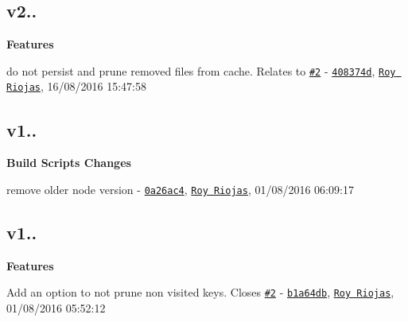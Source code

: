 \subsection*{v2..}


\begin{DoxyItemize}
\item {\bfseries Features}
\begin{DoxyItemize}
\item do not persist and prune removed files from cache. Relates to \href{https://github.com/royriojas/file-entry-cache/issues/2}{\tt \#2} -\/ \href{https://github.com/royriojas/file-entry-cache/commit/408374d}{\tt 408374d}, \href{https://github.com/Roy Riojas}{\tt Roy Riojas}, 16/08/2016 15\+:47\+:58
\end{DoxyItemize}
\end{DoxyItemize}

\subsection*{v1..}


\begin{DoxyItemize}
\item {\bfseries Build Scripts Changes}
\begin{DoxyItemize}
\item remove older node version -\/ \href{https://github.com/royriojas/file-entry-cache/commit/0a26ac4}{\tt 0a26ac4}, \href{https://github.com/Roy Riojas}{\tt Roy Riojas}, 01/08/2016 06\+:09\+:17
\end{DoxyItemize}
\end{DoxyItemize}

\subsection*{v1..}


\begin{DoxyItemize}
\item {\bfseries Features}
\begin{DoxyItemize}
\item Add an option to not prune non visited keys. Closes \href{https://github.com/royriojas/file-entry-cache/issues/2}{\tt \#2} -\/ \href{https://github.com/royriojas/file-entry-cache/commit/b1a64db}{\tt b1a64db}, \href{https://github.com/Roy Riojas}{\tt Roy Riojas}, 01/08/2016 05\+:52\+:12
\end{DoxyItemize}
\end{DoxyItemize}

